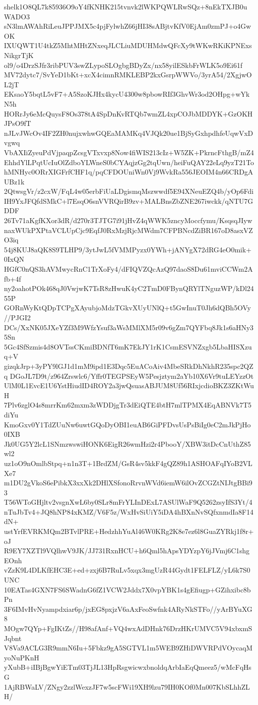 shelk1O8QL7k85936O9oY4fKNHK215tvnvk2lWKPQWLRwSQz+8nEkTXJB0uWADO3
sN3lmAWAhRiLeuJPPJMX5c4pjFylwhZ66jHI38sABjtvKfV0EjAm0zmPJ+o4GwOK
IXUQWT1U4tkZ5MhtMHtZNxeqJLCLiuMDUHMdwQFcXy9tWKwRKiKPNExsNikgrTjK
ol9/o4DrzSJfr3ribPUV3swZLypoSLOgbgBDyZx/nx58yilESkbFrWLK5o9Ei61f
MV72dytc7/SvYeD1bKt+xcX4cimnRMKLEBP2kxGsrpWWVo/3yrA54/2XgjwOL2jT
EKsaoY5bqtL5vF7+A5SzoKJHx4kycU4300w8pbowRIf3GhvWr3od2OHpg+wYkN5h
HORrJy6eMcQuysF8Os378tA4SpDnKvRTQb7wmZL4xpCOJbMDDYK+GzOKHJPsO9fT
nJLvJWcOv4IF2ZH0nujxwhwGQEaMAMKq4VJQk20ue1BjSyGxhpdhfeUqwVxDvgwq
VbAXIiZyeuPdVjpaqpZcsgVTxvxp8Now4fiWIS213cIz+W5ZK+PkrncFthgB/mZ4
EhhdYlLPqtUcIuOlZdboYLWneS0bCYAqjzGg2tqUwn/heiFuQAY22eLq9yzT21To
hMNHyc0ORrXIGFrfCHF1q/pqCFDOUniWn0Vj9WvkRa556JEOIM4n66CRDgAUBz1k
2QtwsgVr/z2cxW/FqL4w05erbFiUaLDgismqMszwwdf5E94XNeuEZQ4b/yOp6Fdi
IH9YxJFQfdSMkC+l7EsqO6snVVRQirB9zv+MALBnsZbZNE267iwckk/qNTU7GDDF
26Tv71aKgfKXor3dR/d270r3TJTG7i91jHvZ4qWWK5zncyMoccfymu/KsqsqJIyw
naxWUkPXPtaVCLUpCjc9EqfJ0RxMzjRjcMWdm7CFPBNcdZiBR167oD8asxVZO3iq
54j8KUJ8aQK8S9TLHP9/3ytJwL5fVMMPyzx0YWh+jANYgX72dRG4eO0mik+0IxQN
HGfC0nQS3hAVMwycRnC1TrXoFy4/dFIQVZQcAzQ97daoS8Du61mviCCWm2Afb+4f
ny2oahotPOk468qJ0VwjwK7TsR8zHwuK4yC2TmD0FBynQRYlTNguzWP/kDl2455P
GORnWyKtQDpTCPgXAyubjoMdzTGkvXUyUNlQ+t5GwInuT0Jh6dQBh5OVy//PJGI2
DCs/XxNK05JXeYZf3M9WfzYsuf3aWsMMlXM5r09v6gZm7QYFbq8Jk1s6aHNy35Sn
5Gc4SfSzmis4d8OVTssCKmiBDNfT6mK7EkJY1rK1CsmESVNZxgb5LbaHISXzuq+V
gizqkJrp+3yPY9lGJ1d1mM9ipd1E3Dqc5EuACoAiv4MbeSRkDhNkhR235spc2QZq
DGoJL7D9t/z964Zrswlc6/Yffr0TEGPSEyW5Pesjztym2aYb10X6Vr9tuLEYzzOt
UlM0L1EvcE1U6YstHiudID4ROY2a3jwQsuasABJUM8Uf56RIxjcdioBKZ3ZKtWuH
7Plv6zglO4s8mrrKm62mxm3zWDDjgTr3dEiQTE4btH7mlTPMX4EqABNVk7T5diYu
KmoGxv0Y1TdZUuNw6uwtGQoDyOBI1euAB6GiPFDvsUsPsBiIg0eC2mJkPjHo0IXB
Jk0UG5Y2lcL1SNmzwswiHONK6EigR26wmHzi2r4PbooY/XBW3itDcCnUthZ85wl2
uz1oO9nOmlbStpq+n1n3T+1BrdZM/GsR4sv5kkF4gQZ89h1ASHOAFqIYoB2VLXe7
m1DU2gVkoS6ePibkX3xxXk2DHlXSfonoRrvnWVd6iemW6ilOvZCGZtNIJtgBBi93
T56WToGHjltv2vsgnXwL6by0SLr8mFrYLInDExL7ASUlWaF9Q5262zsyIfS3Yt/4
nTuJbTv4+JQ8hNP84xKMZ/V6F5z/WxHvSiUiY5iDA4hBXnNvSQfxnmdIa8F14dN+
ustYrfEVRKMQm2BTvlPRE+HedzhhYuAl46W0KRg2K8e7ez6l8GuaZYRkj1f8r+oJ
R9EY7XZTl9VQlhwV9JK/JJ731RxnHCU+h6Qml5hApsYDYzpY6jJVmj6C1shgEOnh
vZzK9L4DLKfEHC3E+ed+zxj6B7RuLv5xqx3mgUzR44Gydt1FELFLZ/yL6k7S0UNC
10EATas4GXN7FS6SWadnG6fZ1VCW2Jddx7X0vpYBK1s4gEfiugp+GZihxibc8bPn
3F6IMvHvNyampdxiar6p/jxEG8pxjzV6aAxFeoSwfnk4ARyNkSTFo//yArBYuXG8
MOgw7QYp+FgIKtZs//H98afAnf+VQ4wxAdDHnk76DrzHKrUMVC5V94xbxmSJqbnt
V8Va9ACLG3R9mmN6Iu+5Fbkz9gA5SGTVL1m5WEB9ZHiDWVRPdVOycaqMyoNuPKnH
yXubB+iIBjBgwYiETm03TjJL13HpRsgwicwxbnoldqArbIaEqQmeez5/wMcFqHsG
1AjRBWaLV/ZNgy2zzlWexzJF7w5scFWi19XH9lzu79IH0KOf0Mn007KbSLhhZLH/
